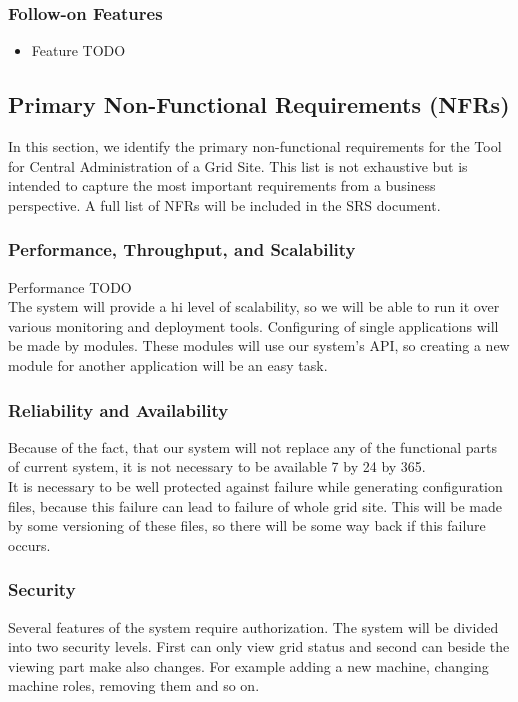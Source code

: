 \documentclass[12pt]{article}
\begin{document}
\subsubsection{Follow-on Features}
\begin{itemize}
\item Feature TODO
\end{itemize}

\subsection{Primary Non-Functional Requirements (NFRs)}
In this section, we identify the primary non-functional requirements for the Tool for Central Administration of a Grid Site. This list is not exhaustive but is intended to capture the most important requirements from a business perspective. A full list of NFRs will be included in the SRS document.

\subsubsection{Performance, Throughput, and Scalability}
Performance TODO\\
The system will provide a hi level of scalability, so we will be able to run it over various monitoring and deployment tools. Configuring of single applications will be made by modules. These modules will use our system's API, so creating a new module for another application will be an easy task.

\subsubsection{Reliability and Availability}
Because of the fact, that our system will not replace any of the functional parts of current system, it is not necessary to be available 7 by 24 by 365.\\
It is necessary to be well protected against failure while generating configuration files, because this failure can lead to failure of whole grid site. This will be made by some versioning of these files, so there will be some way back if this failure occurs.

\subsubsection{Security}
Several features of the system require authorization. The system will be divided into two security levels. First can only view grid status and second can beside the viewing part make also changes. For example adding a new machine, changing machine roles, removing them and so on.
\end{document}
